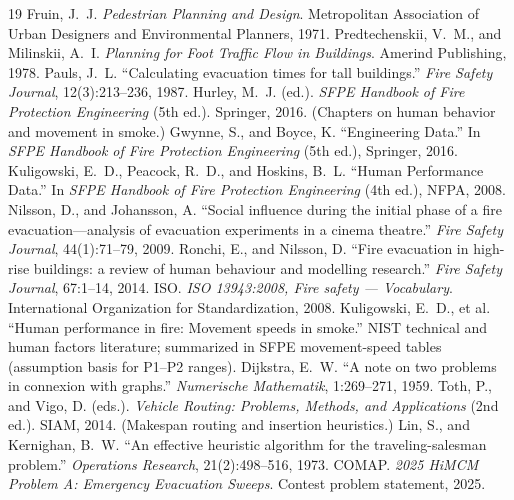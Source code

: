 \documentclass{mcmthesis}
\begin{document}
\begin{thebibliography}{19}
 Fruin, J.~J. \emph{Pedestrian Planning and Design}. Metropolitan Association of Urban Designers and Environmental Planners, 1971.
 Predtechenskii, V.~M., and Milinskii, A.~I. \emph{Planning for Foot Traffic Flow in Buildings}. Amerind Publishing, 1978.
 Pauls, J.~L. ``Calculating evacuation times for tall buildings.'' \emph{Fire Safety Journal}, 12(3):213--236, 1987.
 Hurley, M.~J. (ed.). \emph{SFPE Handbook of Fire Protection Engineering} (5th ed.). Springer, 2016. (Chapters on human behavior and movement in smoke.)
 Gwynne, S., and Boyce, K. ``Engineering Data.'' In \emph{SFPE Handbook of Fire Protection Engineering} (5th ed.), Springer, 2016.
 Kuligowski, E.~D., Peacock, R.~D., and Hoskins, B.~L. ``Human Performance Data.'' In \emph{SFPE Handbook of Fire Protection Engineering} (4th ed.), NFPA, 2008.
 Nilsson, D., and Johansson, A. ``Social influence during the initial phase of a fire evacuation---analysis of evacuation experiments in a cinema theatre.'' \emph{Fire Safety Journal}, 44(1):71--79, 2009.
 Ronchi, E., and Nilsson, D. ``Fire evacuation in high-rise buildings: a review of human behaviour and modelling research.'' \emph{Fire Safety Journal}, 67:1--14, 2014.
 ISO. \emph{ISO 13943:2008, Fire safety --- Vocabulary}. International Organization for Standardization, 2008.
 Kuligowski, E.~D., et al. ``Human performance in fire: Movement speeds in smoke.'' NIST technical and human factors literature; summarized in SFPE movement-speed tables (assumption basis for P1--P2 ranges).
 Dijkstra, E.~W. ``A note on two problems in connexion with graphs.'' \emph{Numerische Mathematik}, 1:269--271, 1959.
 Toth, P., and Vigo, D. (eds.). \emph{Vehicle Routing: Problems, Methods, and Applications} (2nd ed.). SIAM, 2014. (Makespan routing and insertion heuristics.)
 Lin, S., and Kernighan, B.~W. ``An effective heuristic algorithm for the traveling-salesman problem.'' \emph{Operations Research}, 21(2):498--516, 1973.
 COMAP. \emph{2025 HiMCM Problem A: Emergency Evacuation Sweeps}. Contest problem statement, 2025.
\end{thebibliography}

\appendix
\end{document}
